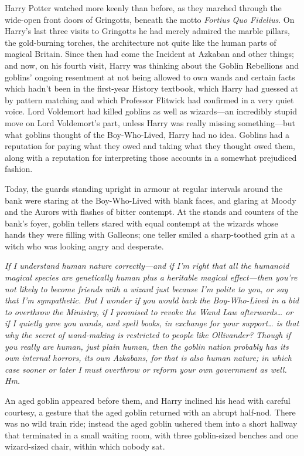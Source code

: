 Harry Potter watched more keenly than before, as they marched through the wide-open front doors of Gringotts, beneath the motto \emph{Fortius Quo Fidelius}. On Harry's last three visits to Gringotts he had merely admired the marble pillars, the gold-burning torches, the architecture not quite like the human parts of magical Britain. Since then had come the Incident at Azkaban and other things; and now, on his fourth visit, Harry was thinking about the Goblin Rebellions and goblins' ongoing resentment at not being allowed to own wands and certain facts which hadn't been in the first-year History textbook, which Harry had guessed at by pattern matching and which Professor Flitwick had confirmed in a very quiet voice. Lord Voldemort had killed goblins as well as wizards—an incredibly stupid move on Lord Voldemort's part, unless Harry was really missing something—but what goblins thought of the Boy-Who-Lived, Harry had no idea. Goblins had a reputation for paying what they owed and taking what they thought owed them, along with a reputation for interpreting those accounts in a somewhat prejudiced fashion.

Today, the guards standing upright in armour at regular intervals around the bank were staring at the Boy-Who-Lived with blank faces, and glaring at Moody and the Aurors with flashes of bitter contempt. At the stands and counters of the bank's foyer, goblin tellers stared with equal contempt at the wizards whose hands they were filling with Galleons; one teller smiled a sharp-toothed grin at a witch who was looking angry and desperate.

\emph{If I understand human nature correctly—and if I'm right that all the humanoid magical species are genetically human plus a heritable magical effect—then you're not likely to become friends with a wizard just because I'm polite to you, or say that I'm sympathetic. But I wonder if you would back the Boy-Who-Lived in a bid to overthrow the Ministry, if I promised to revoke the Wand Law afterwards{\ldots} or if I quietly gave you wands, and spell books, in exchange for your support{\ldots} is that why the secret of wand-making is restricted to people like Ollivander? Though if you really are human, just plain human, then the goblin nation probably has its own internal horrors, its own Azkabans, for that is also human nature; in which case sooner or later I must overthrow or reform your own government as well. Hm.}

An aged goblin appeared before them, and Harry inclined his head with careful courtesy, a gesture that the aged goblin returned with an abrupt half-nod. There was no wild train ride; instead the aged goblin ushered them into a short hallway that terminated in a small waiting room, with three goblin-sized benches and one wizard-sized chair, within which nobody sat.

